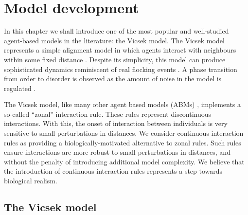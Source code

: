 \graphicspath{{fig/model_development/}}

\chapter{Model development}
\label{cha:model_dev}

In this chapter we shall introduce one of the most popular and well-studied
agent-based models in the literature: the Vicsek model. The Vicsek model
represents a simple alignment model in which agents interact with neighbours
within some fixed distance \parencite{vicsek95}. Despite its simplicity, this
model can produce sophisticated dynamics reminiscent of real flocking events
\parencite{ginelli16}. A phase transition from order to disorder is observed as
the amount of noise in the model is regulated \parencite{vicsek12}.

The Vicsek model, like many other agent based models (ABMs)
\parencite{aoki82,couzin02,huth92}, implements a so-called ``zonal''
interaction rule. These rules represent discontinuous interactions. With this,
the onset of interaction between individuals is very sensitive to small
perturbations in distances. We consider continuous interaction rules as
providing a biologically-motivated alternative to zonal rules. Such rules
ensure interactions are more robust to small perturbations in distances, and
without the penalty of introducing additional model complexity. We believe that
the introduction of continuous interaction rules represents a step towards
biological realism. 

\section{The Vicsek model}
\label{sec:vicsek_model}

